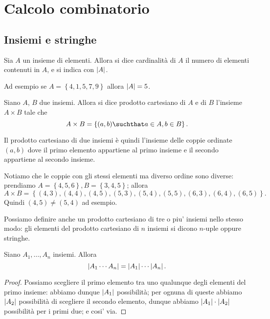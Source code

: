 \chapter{Calcolo combinatorio}

\section{Insiemi e stringhe}

\begin{definition}
    Sia $A$ un insieme di elementi. Allora si dice cardinalità di $A$ il numero di elementi contenuti in $A$, e si indica con $\left|A\right|$.
\end{definition}
Ad esempio se $A = \left\{ 4, 1, 5, 7, 9\right\}$ allora $\left|A\right| = 5$.

\begin{definition}
    Siano $A$, $B$ due insiemi. Allora si dice prodotto cartesiano di $A$ e di $B$ l'insieme $A \times B$ tale che \[
        A \times B = \left\{ (a, b) \suchthat a \in A, b \in B\right\}   
    .\]
\end{definition}
Il prodotto cartesiano di due insiemi è quindi l'insieme delle coppie ordinate $(a, b)$ dove il primo elemento appartiene al primo insieme e il secondo appartiene al secondo insieme. 

Notiamo che le coppie con gli stessi elementi ma diverso ordine sono diverse: prendiamo $A = \left\{ 4, 5, 6 \right\}, B = \left\{ 3, 4, 5 \right\}$; allora \[
    A \times B = \left\{ (4, 3), (4, 4), (4, 5), (5, 3), (5, 4), (5, 5), (6, 3), (6, 4), (6, 5)\right\}   
.\] Quindi $(4, 5) \neq (5, 4)$ ad esempio.

Possiamo definire anche un prodotto cartesiano di tre o piu' insiemi nello stesso modo: gli elementi del prodotto cartesiano di $n$ insiemi si dicono $n$-uple oppure stringhe.

\begin{proposition}\label{cardinalita_prodotto_cartesiano}
    Siano $A_1, \dots, A_n$ insiemi. Allora \begin{equation}
        \left|A_1 \cdots A_n\right| = \left|A_1\right| \cdots \left|A_n\right|.
    \end{equation}
\end{proposition}
\begin{proof}
    Possiamo scegliere il primo elemento tra uno qualunque degli elementi del primo insieme: abbiamo dunque $\left|A_1\right|$ possibilità; per ognuna di queste abbiamo $\left|A_2\right|$ possibilità di scegliere il secondo elemento, dunque abbiamo $\left|A_1\right| \cdot \left|A_2\right|$ possibilità per i primi due; e cosi' via.
\end{proof}

